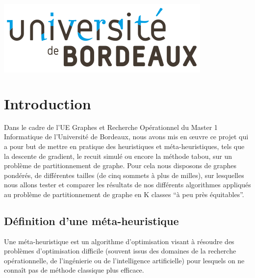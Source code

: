 \documentclass[a4paper]{article}
\begin{document}
\begin{titlepage}

\includegraphics{img/logo.png}\\[1cm]
 

\vfill
\end{titlepage}

\tableofcontents

\newpage

\section{Introduction}
Dans le cadre de l'UE Graphes et Recherche Opérationnel du Master 1 Informatique de l'Université de Bordeaux, nous avons mis en œuvre ce projet qui a pour but de mettre en pratique des heuristiques et méta-heuristiques, tels que la descente de gradient, le recuit simulé ou encore la méthode tabou, sur un problème de partitionnement de graphe. Pour cela nous disposons de graphes pondérés, de différentes tailles (de cinq sommets à plus de milles), sur lesquelles nous allons tester et comparer les résultats de nos différents algorithmes appliqués au problème de partitionnement de graphe en K classes ``à peu près équitables''.

	\subsection{Définition d'une méta-heuristique}
	\begin{textit}
	Une méta-heuristique est un algorithme d’optimisation visant à résoudre des problèmes d’optimisation difficile (souvent issus des domaines de la recherche opérationnelle, de l'ingénierie ou de l'intelligence artificielle) pour lesquels on ne connaît pas de méthode classique plus efficace.
	\end{textit}
\end{document}
